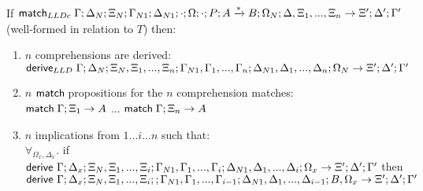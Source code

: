 \begin{theorem}
   If $\mathsf{match}_{LLDc} \; \Gamma; \Delta_N; \Xi_N; \Gamma_{N1}; \Delta_{N1}; \cdot; \Omega; \cdot; P; A \xrightarrow{*} B; \Omega_N; \Delta, \Xi_1, ..., \Xi_n \rightarrow \Xi'; \Delta'; \Gamma'$ (well-formed in relation to $T$) then:
   
   \begin{enumerate}
      \item $n$ comprehensions are derived:\\
      $\mathsf{derive}_{LLD} \; \Gamma; \Delta_N; \Xi_N, \Xi_1, ..., \Xi_n; \Gamma_{N1}, \Gamma_1, ..., \Gamma_n; \Delta_{N1}, \Delta_1, ..., \Delta_n; \Omega_N \rightarrow \Xi'; \Delta'; \Gamma'$
      \item $n$ $\mathsf{match} \;$propositions for the $n$ comprehension matches:\\
      $\mathsf{match} \; \Gamma; \Xi_1 \rightarrow A$ ... $\mathsf{match} \; \Gamma; \Xi_n \rightarrow A$
      \item $n$ implications from $1...i...n$ such that: \\
      $\forall_{\Omega_x, \Delta_x}.$ if $\mathsf{derive}~ \Gamma; \Delta_x; \Xi_N, \Xi_1, ..., \Xi_i; \Gamma_{N1}, \Gamma_1, ..., \Gamma_i; \Delta_{N1}, \Delta_1, ..., \Delta_i; \Omega_x \rightarrow \Xi'; \Delta'; \Gamma'$ then \\$\mathsf{derive}~ \Gamma; \Delta_x; \Xi_N, \Xi_1, ..., \Xi_i; ; \Gamma_{N1}, \Gamma_1, ..., \Gamma_{i-1}; \Delta_{N1}, \Delta_1, ..., \Delta_{i-1}; B, \Omega_x \rightarrow \Xi'; \Delta'; \Gamma'$
   \end{enumerate}
\end{theorem}


